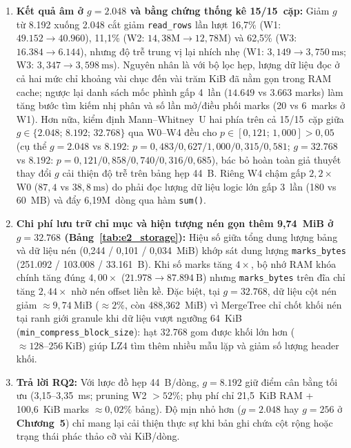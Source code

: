 \documentclass[13pt,a4paper]{report}
\begin{document}
\begin{enumerate}
    \setlength{\itemsep}{3pt}\setlength{\parskip}{0pt}
    \item \textbf{Kết quả âm ở $g = 2.048$ và bằng chứng thống kê 15/15~cặp:} Giảm $g$ từ 8.192 xuống 2.048 cắt giảm \texttt{read\_\allowbreak{}rows} lần lượt 16,7\% (W1: $49.152 \rightarrow 40.960$), 11,1\% (W2: $14{,}38\text{M} \rightarrow 12{,}78\text{M}$) và 62,5\% (W3: $16.384 \rightarrow 6.144$), nhưng độ trễ trung vị lại nhích nhẹ (W1: $3{,}149 \rightarrow 3{,}750~\text{ms}$; W3: $3{,}347 \rightarrow 3{,}598~\text{ms}$). Nguyên nhân là với bộ lọc hẹp, lượng dữ liệu đọc ở cả hai mức chỉ khoảng vài chục đến vài trăm KiB đã nằm gọn trong RAM cache; ngược lại danh sách mốc phình gấp 4~lần ($14.649$ vs $3.663$ marks) làm tăng bước tìm kiếm nhị phân và số lần mở/điều phối marks (20 vs 6~marks ở W1). Hơn nữa, kiểm định Mann--Whitney~U hai phía trên cả 15/15~cặp giữa $g \in \{2.048;\, 8.192;\, 32.768\}$ qua W0--W4 đều cho $p \in [0{,}121;\, 1{,}000] > 0{,}05$ (cụ thể $g=2.048$ vs $8.192$: $p = 0{,}483 / 0{,}627 / 1{,}000 / 0{,}315 / 0{,}581$; $g=32.768$ vs $8.192$: $p = 0{,}121 / 0{,}858 / 0{,}740 / 0{,}316 / 0{,}685$), bác bỏ hoàn toàn giả thuyết thay đổi $g$ cải thiện độ trễ trên bảng hẹp 44~B. Riêng W4 chậm gấp $2{,}2{\times}$ W0 ($87{,}4$ vs $38{,}8~\text{ms}$) do phải đọc lượng dữ liệu logic lớn gấp 3~lần (180 vs 60~MB) và đẩy 6,19M~dòng qua hàm \texttt{sum()}.
    \item \textbf{Chi phí lưu trữ chỉ mục và hiện tượng nén gọn thêm 9,74~MiB ở $g = 32.768$ (Bảng~\ref{tab:e2_storage}):} Hiệu số giữa tổng dung lượng bảng và dữ liệu nén (0,244 / 0,101 / 0,034~MiB) khớp sát dung lượng \texttt{marks\_\allowbreak{}bytes} (251.092 / 103.008 / 33.161~B). Khi số marks tăng $4{\times}$, bộ nhớ RAM khóa chính tăng đúng $4{,}00{\times}$ ($21.978 \rightarrow 87.894~\text{B}$) nhưng \texttt{marks\_\allowbreak{}bytes} trên đĩa chỉ tăng $2{,}44{\times}$ nhờ nén offset liền kề. Đặc biệt, tại $g = 32.768$, dữ liệu cột nén giảm $\approx 9{,}74~\text{MiB}$ ($\approx 2\%$, còn 488,362~MiB) vì MergeTree chỉ chốt khối nén tại ranh giới granule khi dữ liệu vượt ngưỡng 64~KiB (\texttt{min\_\allowbreak{}compress\_\allowbreak{}block\_\allowbreak{}size}): hạt 32.768 gom được khối lớn hơn ($\approx 128\text{--}256~\text{KiB}$) giúp LZ4 tìm thêm nhiều mẫu lặp và giảm số lượng header khối.
    \item \textbf{Trả lời RQ2:} Với lược đồ hẹp 44~B/dòng, \textbf{$g = 8.192$} giữ điểm cân bằng tối ưu (3,15--3,35~ms; pruning W2 $> 52\%$; phụ phí chỉ 21,5~KiB RAM + 100,6~KiB marks $\approx 0{,}02\%$ bảng). Độ mịn nhỏ hơn ($g = 2.048$ hay $g = 256$ ở \textbf{Chương~5}) chỉ mang lại cải thiện thực sự khi bản ghi chứa cột rộng hoặc trạng thái phác thảo cỡ vài KiB/dòng.
\end{enumerate}
\end{document}
